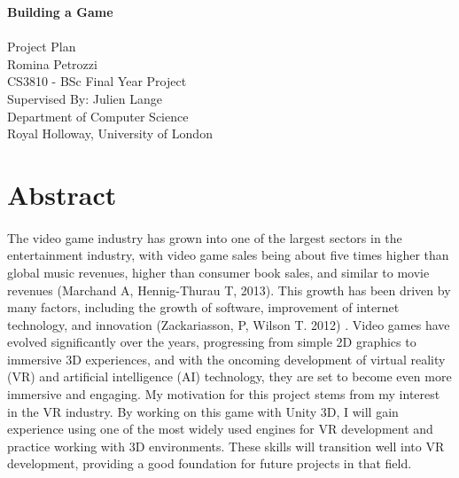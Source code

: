 \documentclass[12pt]{article}
\begin{document}
\begin{titlepage}
    \centering
    \vspace*{5cm}
    \LARGE\textbf{Building a Game}\\
    \vspace{1cm}
    \hrulefill\\[0.5cm] %
    \large Project Plan\\
    \vspace{0.5cm}
    \large Romina Petrozzi\\
    \vspace{0.5cm}
    \large CS3810 - BSc Final Year Project\\
    \vspace{2cm}
    \large Supervised By: Julien Lange\\
    \vspace{0.5cm}
    \large Department of Computer Science\\
    \large Royal Holloway, University of London\\
    \vfill
\end{titlepage}

\tableofcontents{}
\newpage
\section{\centering Abstract}
\paragraph{}
The video game industry has grown into one of the largest sectors in the entertainment industry, with video game sales being about five times higher than global music revenues, higher than consumer book sales, and similar to movie revenues (Marchand A, Hennig-Thurau T, 2013). This growth has been driven by many factors, including the growth of software, improvement of internet technology, and innovation (Zackariasson, P, Wilson T. 2012) . Video games have evolved significantly over the years, progressing from simple 2D graphics to immersive 3D experiences, and with the oncoming development of virtual reality (VR) and artificial intelligence (AI) technology, they are set to become even more immersive and engaging.
My motivation for this project stems from my interest in the VR industry. By working on this game with Unity 3D, I will gain experience using one of the most widely used engines for VR development and practice working with 3D environments. These skills will transition well into VR development, providing a good foundation for future projects in that field.
\end{document}
